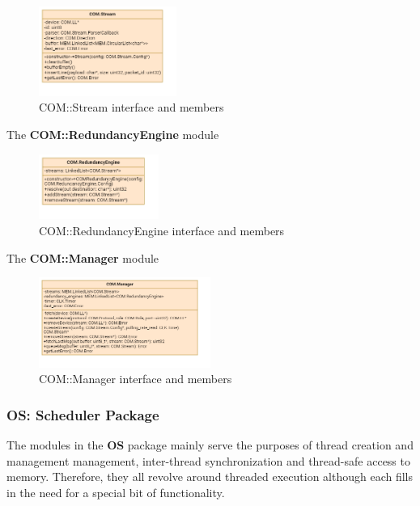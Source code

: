 \begin{figure}[H]
	\centering
	\includegraphics[width=0.4\textwidth]{./img/navig-class-stream.png}
	\caption {COM::Stream interface and members}
	\label{fig:navig-class-stream}
	\end{figure}


The \textbf{COM::RedundancyEngine} module 

\begin{figure}[H]
	\centering
	\includegraphics[width=0.35\textwidth]{./img/navig-class-redundancy-engine.png}
	\caption {COM::RedundancyEngine interface and members}
	\label{fig:navig-class-redundancy-engine}
	\end{figure}


The \textbf{COM::Manager} module 
	
\begin{figure}[H]
	\centering
	\includegraphics[width=0.5\textwidth]{./img/navig-class-manager.png}
	\caption {COM::Manager interface and members}
	\label{fig:navig-class-manager}
	\end{figure}



\subsubsection{OS: Scheduler Package}
\label{sec:osPack}
The modules in the \textbf{OS} package mainly serve the purposes of thread creation and management management, inter-thread synchronization and thread-safe access to memory. Therefore, they all revolve around threaded execution although each fills in the need for a special bit of functionality.

